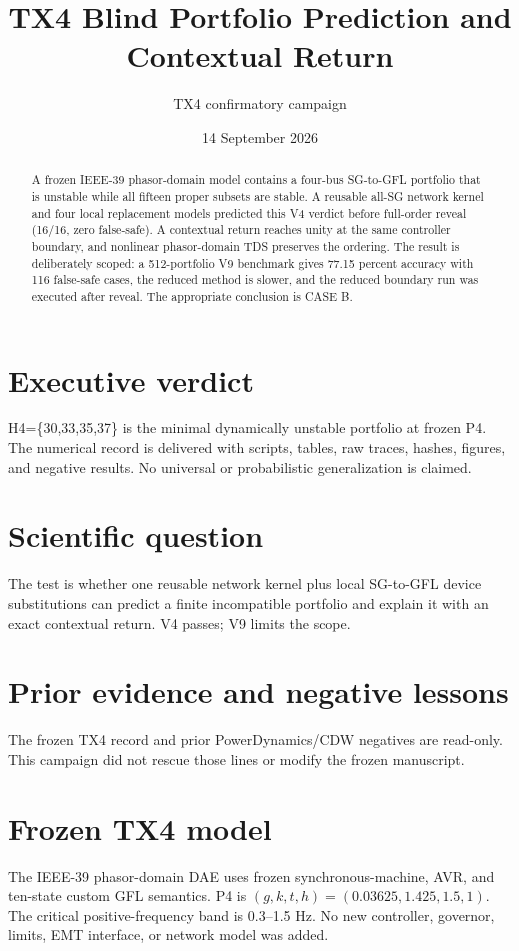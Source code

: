 \documentclass[10pt]{article}
\title{TX4 Blind Portfolio Prediction and Contextual Return}
\author{TX4 confirmatory campaign}
\date{14 September 2026}
\begin{document}
\maketitle
\begin{abstract}
A frozen IEEE-39 phasor-domain model contains a four-bus SG-to-GFL portfolio
that is unstable while all fifteen proper subsets are stable. A reusable
all-SG network kernel and four local replacement models predicted this V4
verdict before full-order reveal (16/16, zero false-safe). A contextual
return reaches unity at the same controller boundary, and nonlinear
phasor-domain TDS preserves the ordering. The result is deliberately scoped:
a 512-portfolio V9 benchmark gives 77.15 percent accuracy with 116 false-safe
cases, the reduced method is slower, and the reduced boundary run was
executed after reveal. The appropriate conclusion is CASE B.
\end{abstract}
\section{Executive verdict}
H4=\{30,33,35,37\} is the minimal dynamically unstable portfolio at frozen
P4. The numerical record is delivered with scripts, tables, raw traces,
hashes, figures, and negative results. No universal or probabilistic
generalization is claimed.

\section{Scientific question}
The test is whether one reusable network kernel plus local SG-to-GFL device
substitutions can predict a finite incompatible portfolio and explain it with
an exact contextual return. V4 passes; V9 limits the scope.

\section{Prior evidence and negative lessons}
The frozen TX4 record and prior PowerDynamics/CDW negatives are read-only.
This campaign did not rescue those lines or modify the frozen manuscript.

\section{Frozen TX4 model}
The IEEE-39 phasor-domain DAE uses frozen synchronous-machine, AVR, and
ten-state custom GFL semantics. P4 is
$(g,k,t,h)=(0.03625,1.425,1.5,1)$. The critical positive-frequency band is
0.3--1.5 Hz. No new controller, governor, limits, EMT interface, or network
model was added.
\end{document}
